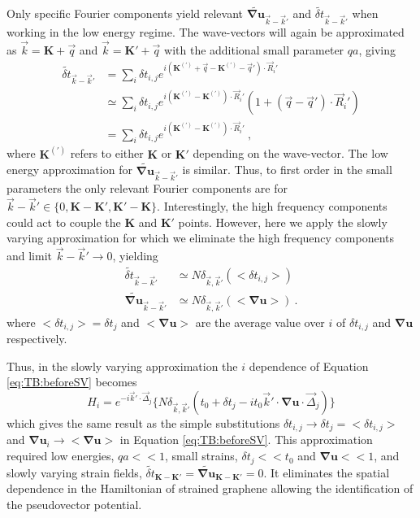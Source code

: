 Only specific Fourier components yield relevant $\widetilde{\bm{\nabla u}}_{\vec{k}-\vec{k}'}$ and $\widetilde{\delta t}_{\vec{k}-\vec{k}'}$ when working in the low energy regime.
The wave-vectors will again be approximated as $\vec{k}=\bm{K}+\vec{q}$ and $\vec{k}=\bm{K'}+\vec{q}$ with the additional small parameter $qa$, giving
\begin{align*}
  \widetilde{\delta t}_{\vec{k}-\vec{k}'} &=
    \sum_i \delta t_{i,j} e^{i(\bm{K^{(')}}+\vec{q}-\bm{K^{(')}}-\vec{q}') \cdot \vec{R}_i'} \\
                              &\simeq 
    \sum_i \delta t_{i,j} e^{i(\bm{K^{(')}}-\bm{K^{(')}}) \cdot \vec{R}_i'} (1+(\vec{q}-\vec{q}') \cdot \vec{R}_i') \\
                              &=
    \sum_i \delta t_{i,j} e^{i(\bm{K^{(')}}-\bm{K^{(')}}) \cdot \vec{R}_i'} \ ,
\end{align*}
where $\bm{K^{(')}}$ refers to either $\bm{K}$ or $\bm{K'}$ depending on the wave-vector.
The low energy approximation for $\widetilde{\bm{\nabla u}}_{\vec{k}-\vec{k}'}$ is similar.
Thus, to first order in the small parameters the only relevant Fourier components are for $\vec{k}-\vec{k}' \in \{0,\bm{K}-\bm{K'}, \bm{K'}-\bm{K} \}$.
Interestingly, the high frequency components could act to couple the $\bm{K}$ and $\bm{K}'$ points.
However, here we apply the slowly varying approximation for which we eliminate the high frequency components and limit $\vec{k}-\vec{k}' \rightarrow 0$, yielding
\begin{align*}
  \widetilde{\delta t}_{\vec{k}-\vec{k}'}     & \simeq N \delta_{\vec{k},\vec{k}'} ( <\delta t_{i,j}>) \\
  \widetilde{\bm{\nabla u}}_{\vec{k}-\vec{k}'}& \simeq N \delta_{\vec{k},\vec{k}'} ( <\bm{\nabla u} >) \ .
\end{align*}
where $<\delta t_{i,j}>=\delta t_j$ and $<\bm{\nabla u}>$ are the average value over $i$ of $\delta t_{i,j}$ and $\bm{\nabla u}$ respectively.

Thus, in the slowly varying approximation the $i$ dependence of Equation \ref{eq:TB:beforeSV} becomes
\begin{equation*}
	H_i= e^{-i \vec{k}' \cdot \vec{\Delta}_j} \bigg \{ N \delta_{\vec{k},\vec{k}'}  \left( t_0 + \delta t_j - i t_0 \vec{k}' \cdot \bm{\nabla u} \cdot \vec{\Delta}_j \right) \bigg \}
\end{equation*}
which gives the same result as the simple substitutions $\delta t_{i,j} \rightarrow \delta t_j=<\delta t_{i,j}>$ and $\bm{\nabla u}_i \rightarrow <\bm{\nabla u}>$ in Equation \ref{eq:TB:beforeSV}.
This approximation required low energies, $qa<<1$, small strains, $\delta t_j << t_0$ and $\bm{\nabla u}<<1$, and slowly varying strain fields, $\widetilde{\delta t}_{\bm{K}-\bm{K}'}=\widetilde{\bm{\nabla u}}_{\bm{K}-\bm{K}'}=0$.
It eliminates the spatial dependence in the Hamiltonian of strained graphene allowing the identification of the pseudovector potential.